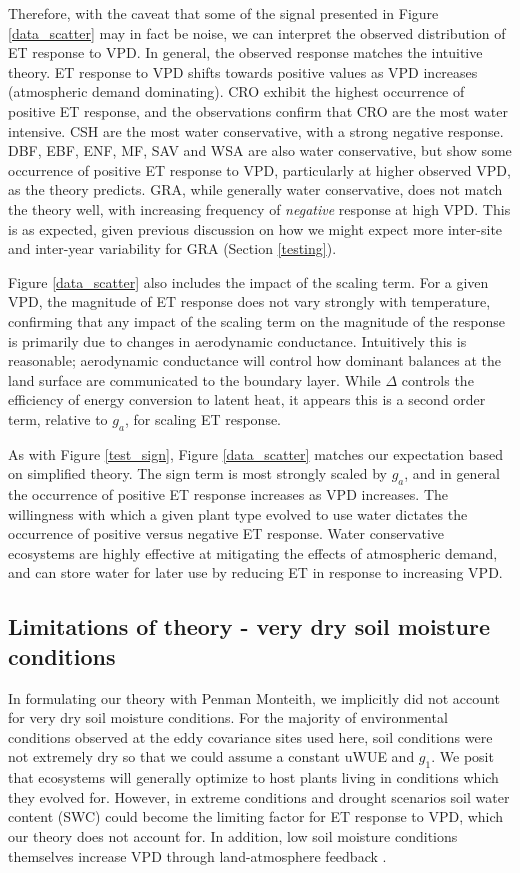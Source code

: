 Therefore, with the caveat that some of the signal presented in Figure
\ref{data_scatter} may in fact be noise, we can interpret the observed
distribution of ET response to VPD. In general, the observed response
matches the intuitive theory. ET response to VPD shifts towards
positive values as VPD increases (atmospheric demand dominating). CRO
exhibit the highest occurrence of positive ET response, and the
observations confirm that CRO are the most water intensive. CSH are
the most water conservative, with a strong negative response. DBF,
EBF, ENF, MF, SAV and WSA are also water conservative, but show some
occurrence of positive ET response to VPD, particularly at higher
observed VPD, as the theory predicts. GRA, while generally water
conservative, does not match the theory well, with increasing frequency of
\textit{negative} response at high VPD. This is as expected, given
previous discussion on how we might expect more inter-site and inter-year variability for GRA (Section \ref{testing}).

Figure \ref{data_scatter} also includes the impact of the scaling
term. For a given VPD, the magnitude of ET response does not vary
strongly with temperature, confirming that any impact of the scaling
term on the magnitude of the response is primarily due to changes in
aerodynamic conductance. Intuitively this is reasonable; aerodynamic
conductance will control how dominant balances at the land surface are
communicated to the boundary layer. While $\Delta$ controls the
efficiency of energy conversion to latent heat, it appears this is a
second order term, relative to $g_a$, for scaling ET response.

As with Figure \ref{test_sign}, Figure \ref{data_scatter} matches our
expectation based on simplified theory. The sign term is most strongly
scaled by $g_a$, and in general the occurrence of positive ET response
increases as VPD increases. The willingness with which a given plant type
evolved to use water dictates the occurrence of positive versus
negative ET response. Water conservative ecosystems are highly effective
at mitigating the effects of atmospheric demand, and can store water
for later use by reducing ET in response to increasing VPD.

\subsection{Limitations of theory - very dry soil moisture conditions}
\label{swc_section}
In formulating our theory with Penman Monteith, we implicitly did not
account for very dry soil moisture conditions. For the majority of
environmental conditions observed at the eddy covariance sites used
here, soil conditions were not extremely dry so that we could assume a
constant uWUE and $g_1$. We posit that ecosystems will generally
optimize to host plants living in conditions which they evolved
for. However, in extreme conditions and drought scenarios soil water
content (SWC) could become the limiting factor for ET response to VPD,
which our theory does not account for. In addition, low soil moisture
conditions themselves increase VPD through land-atmosphere feedback
\citep[][]{Bouchet_1963, Morton_1965, Brutsaert_1999, Ozdogan_2006,
  Salvucci_2013, Gentine_2016, Berg_2016}.

